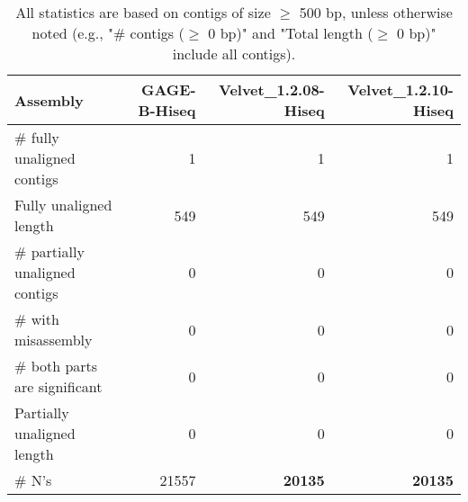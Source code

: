 \documentclass[12pt,a4paper]{article}
\begin{document}
\begin{table}[ht]
\begin{center}
\caption{All statistics are based on contigs of size $\geq$ 500 bp, unless otherwise noted (e.g., "\# contigs ($\geq$ 0 bp)" and "Total length ($\geq$ 0 bp)" include all contigs).}
\begin{tabular}{|l*{3}{|r}|}
\hline
Assembly & GAGE-B-Hiseq & Velvet\_1.2.08-Hiseq & Velvet\_1.2.10-Hiseq \\ \hline
\# fully unaligned contigs & 1 & 1 & 1 \\ \hline
Fully unaligned length & 549 & 549 & 549 \\ \hline
\# partially unaligned contigs & 0 & 0 & 0 \\ \hline
\hspace{5mm}\# with misassembly & 0 & 0 & 0 \\ \hline
\hspace{5mm}\# both parts are significant & 0 & 0 & 0 \\ \hline
Partially unaligned length & 0 & 0 & 0 \\ \hline
\# N's & 21557 & {\bf 20135} & {\bf 20135} \\ \hline
\end{tabular}
\end{center}
\end{table}
\end{document}
